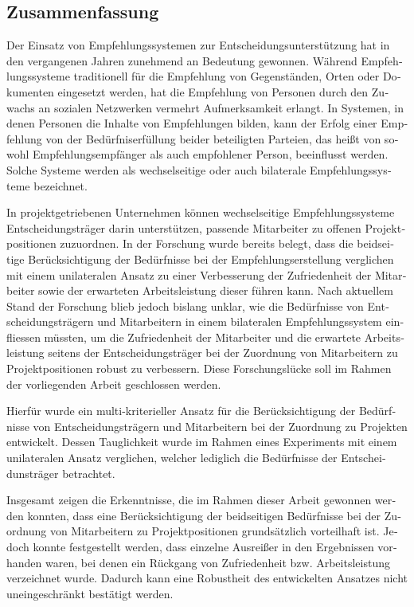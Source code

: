 \begin{otherlanguage}{ngerman}
\chapter*{Zusammenfassung}
Der Einsatz von Empfehlungssystemen zur Entscheidungsunterstützung hat in den vergangenen Jahren zunehmend an Bedeutung gewonnen.
Während Empfehlungssysteme traditionell für die Empfehlung von Gegenständen, Orten oder Dokumenten eingesetzt werden, hat die Empfehlung von Personen durch den Zuwachs an sozialen Netzwerken vermehrt Aufmerksamkeit erlangt.
In Systemen, in denen Personen die Inhalte von Empfehlungen bilden, kann der Erfolg einer Empfehlung von der Bedürfniserfüllung beider beteiligten Parteien, das heißt von sowohl Empfehlungsempfänger als auch empfohlener Person, beeinflusst werden.
Solche Systeme werden als wechselseitige oder auch bilaterale Empfehlungssysteme bezeichnet.

In projektgetriebenen Unternehmen können wechselseitige Empfehlungssysteme Entscheidungsträger darin unterstützen, passende Mitarbeiter zu offenen Projektpositionen zuzuordnen.
In der Forschung wurde bereits belegt, dass die beidseitige Berücksichtigung der Bedürfnisse bei der Empfehlungserstellung verglichen mit einem unilateralen Ansatz zu einer Verbesserung der Zufriedenheit der Mitarbeiter sowie der erwarteten Arbeitsleistung dieser führen kann.
Nach aktuellem Stand der Forschung blieb jedoch bislang unklar, wie die Bedürfnisse von Entscheidungsträgern und Mitarbeitern in einem bilateralen Empfehlungssystem einfliessen müssten, um die Zufriedenheit der Mitarbeiter und die erwartete Arbeitsleistung seitens der Entscheidungsträger bei der Zuordnung von Mitarbeitern zu Projektpositionen robust zu verbessern.
Diese Forschungslücke soll im Rahmen der vorliegenden Arbeit geschlossen werden.

Hierfür wurde ein multi-kriterieller Ansatz für die Berücksichtigung der Bedürfnisse von Entscheidungsträgern und Mitarbeitern bei der Zuordnung zu Projekten entwickelt.
Dessen Tauglichkeit wurde im Rahmen eines Experiments mit einem unilateralen Ansatz verglichen, welcher lediglich die Bedürfnisse der Entscheidunsträger betrachtet.

Insgesamt zeigen die Erkenntnisse, die im Rahmen dieser Arbeit gewonnen werden konnten, dass eine Berücksichtigung der beidseitigen Bedürfnisse bei der Zuordnung von Mitarbeitern zu Projektpositionen grundsätzlich vorteilhaft ist.
Jedoch konnte festgestellt werden, dass einzelne Ausreißer in den Ergebnissen vorhanden waren, bei denen ein Rückgang von Zufriedenheit bzw. Arbeitsleistung verzeichnet wurde.
Dadurch kann eine Robustheit des entwickelten Ansatzes nicht uneingeschränkt bestätigt werden.


\end{otherlanguage}
